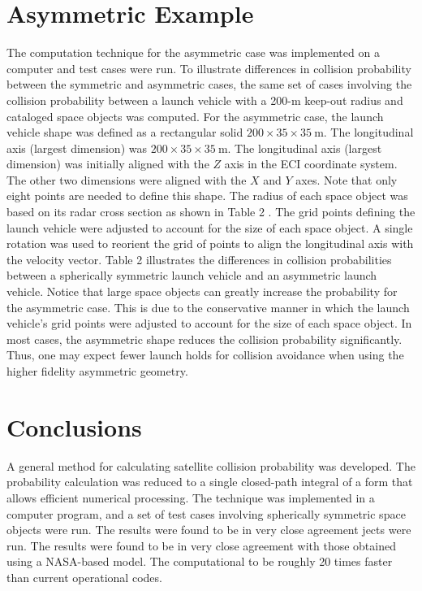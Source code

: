 \documentclass[10pt]{article}
\begin{document}
\section{Asymmetric Example}
The computation technique for the asymmetric case was implemented on a computer and test cases were run. To illustrate differences in collision probability between the symmetric and asymmetric cases, the same set of cases involving the collision probability between a launch vehicle with a 200-m keep-out radius and cataloged space objects was computed. For the asymmetric case, the launch vehicle shape was defined as a rectangular solid $200 \times 35 \times 35 \mathrm{~m}$. The longitudinal axis (largest dimension) was $200 \times 35 \times 35 \mathrm{~m}$. The longitudinal axis (largest dimension) was initially aligned with the $Z$ axis in the ECI coordinate system. The other two dimensions were aligned with the $X$ and $Y$ axes. Note that only eight points are needed to define this shape. The radius of each space object was based on its radar cross section as shown in Table 2 . The grid points defining the launch vehicle were adjusted to account for the size of each space object. A single rotation was used to reorient the grid of points to align the longitudinal axis with the velocity vector. Table 2 illustrates the differences in collision probabilities between a spherically symmetric launch vehicle and an asymmetric launch vehicle. Notice that large space objects can greatly increase the probability for the asymmetric case. This is due to the conservative manner in which the launch vehicle's grid points were adjusted to account for the size of each space object. In most cases, the asymmetric shape reduces the collision probability significantly. Thus, one may expect fewer launch holds for collision avoidance when using the higher fidelity asymmetric geometry.

\section{Conclusions}
A general method for calculating satellite collision probability was developed. The probability calculation was reduced to a single closed-path integral of a form that allows efficient numerical processing. The technique was implemented in a computer program, and a set of test cases involving spherically symmetric space objects were run. The results were found to be in very close agreement jects were run. The results were found to be in very close agreement with those obtained using a NASA-based model. The computational to be roughly 20 times faster than current operational codes.
\end{document}
